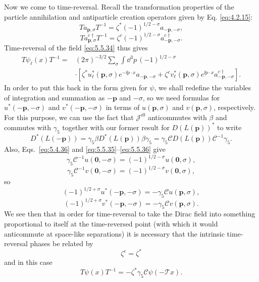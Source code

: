 Now we come to time-reversal. Recall the transformation properties of the
particle annihilation and antiparticle creation operators given by Eq.
\eqref{eq:4.2.15}:
\begin{equation}
T a_{\mathbf p,\sigma}T^{-1}
=\zeta^*(-1)^{1/2-\sigma}a_{-\mathbf p,-\sigma},
\tag{5.5.49}\label{eq:5.5.49}
\end{equation}
\begin{equation}
T a^{c\dagger}_{\mathbf p,\sigma}T^{-1}
=\zeta^c(-1)^{1/2-\sigma}a^{c\dagger}_{-\mathbf p,-\sigma}.
\tag{5.5.50}\label{eq:5.5.50}
\end{equation}
Time-reversal of the field \eqref{eq:5.5.34} thus gives
\begin{align*}
T\psi_\ell(x)T^{-1}={}&(2\pi)^{-3/2}\sum_\sigma\int \dd^3p\,
(-1)^{1/2-\sigma}\\
&\cdot[\zeta^*u_\ell^*(\mathbf p,\sigma)e^{-\ii p\cdot x}a_{-\mathbf p,-\sigma}
+\zeta^c v_\ell^*(\mathbf p,\sigma)e^{\ii p\cdot x}
a^{c\dagger}_{-\mathbf p,-\sigma}].
\end{align*}
In order to put this back in the form given for $\psi$, we shall redefine the
variables of integration and summation as $-\mathbf p$ and $-\sigma$, so we
need formulas for $u^*(-\mathbf p,-\sigma)$ and
$v^*(-\mathbf p,-\sigma)$ in terms of $u(\mathbf p,\sigma)$ and
$v(\mathbf p,\sigma)$, respectively. For this purpose, we can use the fact
that $\mathcal{J}^{i0}$ anticommutes with $\beta$ and commutes with $\gamma_5$
together with our former result for $D(L(\mathbf p))^*$ to write
\[
D^*(L(-\mathbf p))=\gamma_5\beta D^*(L(\mathbf p))\beta\gamma_5
=\gamma_5\mathcal{C}D(L(\mathbf p))\mathcal{C}^{-1}\gamma_5.
\]
Also, Eqs.~\eqref{eq:5.4.36} and \eqref{eq:5.5.35}--\eqref{eq:5.5.36} give
\[
\gamma_5\mathcal{C}^{-1}u(\mathbf0,-\sigma)
=(-1)^{1/2-\sigma}u(\mathbf0,\sigma),
\]
\[
\gamma_5\mathcal{C}^{-1}v(\mathbf0,-\sigma)
=(-1)^{1/2-\sigma}v(\mathbf0,\sigma),
\]
so
\begin{equation}
(-1)^{1/2+\sigma}u^*(-\mathbf p,-\sigma)
=-\gamma_5\mathcal{C}u(\mathbf p,\sigma),
\tag{5.5.51}\label{eq:5.5.51}
\end{equation}
\begin{equation}
(-1)^{1/2+\sigma}v^*(-\mathbf p,-\sigma)
=-\gamma_5\mathcal{C}v(\mathbf p,\sigma).
\tag{5.5.52}\label{eq:5.5.52}
\end{equation}
We see then that in order for time-reversal to take the Dirac field into
something proportional to itself at the time-reversed point (with which it
would anticommute at space-like separations) it is necessary that the intrinsic
time-reversal phases be related by
\begin{equation}
\zeta^c=\zeta^*
\tag{5.5.53}\label{eq:5.5.53}
\end{equation}
and in this case
\begin{equation}
T\psi(x)T^{-1}=-\zeta^*\gamma_5\mathcal{C}\psi(-\mathcal T x).
\tag{5.5.54}\label{eq:5.5.54}
\end{equation}

